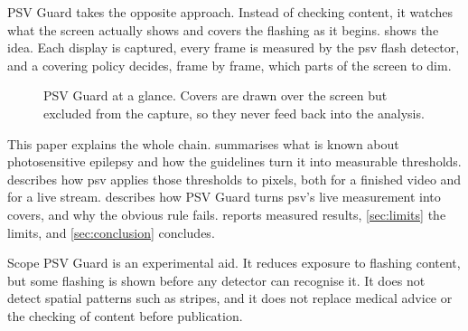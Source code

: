 \documentclass[11pt,a4paper]{article}
\newcommand{\psv}{\textsf{psv}}
\newcommand{\guard}{PSV Guard}
\begin{document}
\guard{} takes the opposite approach. Instead of checking content, it watches what the screen actually shows and covers the flashing as it begins.  shows the idea. Each display is captured, every frame is measured by the \psv{} flash detector, and a covering policy decides, frame by frame, which parts of the screen to dim.

\begin{figure}[ht]
  \centering
  \caption{\guard{} at a glance. Covers are drawn over the screen but excluded from the capture, so they never feed back into the analysis.}
  \label{fig:overview}
\end{figure}

This paper explains the whole chain.  summarises what is known about photosensitive epilepsy and how the guidelines turn it into measurable thresholds.  describes how \psv{} applies those thresholds to pixels, both for a finished video and for a live stream.  describes how \guard{} turns \psv{}'s live measurement into covers, and why the obvious rule fails.  reports measured results, \cref{sec:limits} the limits, and \cref{sec:conclusion} concludes.

\begin{keypoint}{Scope}
\guard{} is an experimental aid. It reduces exposure to flashing content, but some flashing is shown before any detector can recognise it. It does not detect spatial patterns such as stripes, and it does not replace medical advice or the checking of content before publication.
\end{keypoint}
\end{document}
